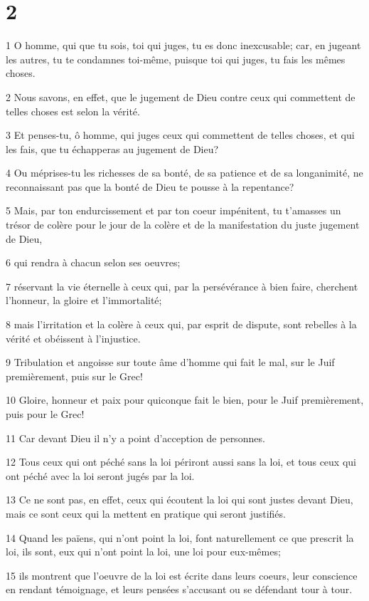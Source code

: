 \chapter{2}

\par 1 O homme, qui que tu sois, toi qui juges, tu es donc inexcusable; car, en jugeant les autres, tu te condamnes toi-même, puisque toi qui juges, tu fais les mêmes choses.
\par 2 Nous savons, en effet, que le jugement de Dieu contre ceux qui commettent de telles choses est selon la vérité.
\par 3 Et penses-tu, ô homme, qui juges ceux qui commettent de telles choses, et qui les fais, que tu échapperas au jugement de Dieu?
\par 4 Ou méprises-tu les richesses de sa bonté, de sa patience et de sa longanimité, ne reconnaissant pas que la bonté de Dieu te pousse à la repentance?
\par 5 Mais, par ton endurcissement et par ton coeur impénitent, tu t'amasses un trésor de colère pour le jour de la colère et de la manifestation du juste jugement de Dieu,
\par 6 qui rendra à chacun selon ses oeuvres;
\par 7 réservant la vie éternelle à ceux qui, par la persévérance à bien faire, cherchent l'honneur, la gloire et l'immortalité;
\par 8 mais l'irritation et la colère à ceux qui, par esprit de dispute, sont rebelles à la vérité et obéissent à l'injustice.
\par 9 Tribulation et angoisse sur toute âme d'homme qui fait le mal, sur le Juif premièrement, puis sur le Grec!
\par 10 Gloire, honneur et paix pour quiconque fait le bien, pour le Juif premièrement, puis pour le Grec!
\par 11 Car devant Dieu il n'y a point d'acception de personnes.
\par 12 Tous ceux qui ont péché sans la loi périront aussi sans la loi, et tous ceux qui ont péché avec la loi seront jugés par la loi.
\par 13 Ce ne sont pas, en effet, ceux qui écoutent la loi qui sont justes devant Dieu, mais ce sont ceux qui la mettent en pratique qui seront justifiés.
\par 14 Quand les païens, qui n'ont point la loi, font naturellement ce que prescrit la loi, ils sont, eux qui n'ont point la loi, une loi pour eux-mêmes;
\par 15 ils montrent que l'oeuvre de la loi est écrite dans leurs coeurs, leur conscience en rendant témoignage, et leurs pensées s'accusant ou se défendant tour à tour.
